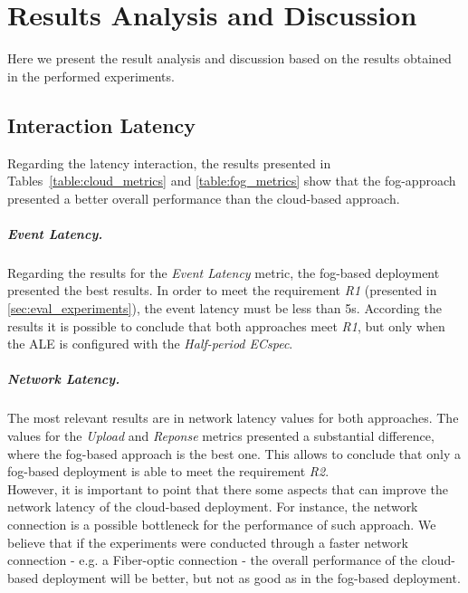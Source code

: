         \section{Results Analysis and Discussion}
        \label{sec:eval_analysis}
        Here we present the result analysis and discussion based on the results obtained in the performed
        experiments.

        \subsection{Interaction Latency}
        \label{subs:eval_results_latency}
        Regarding the latency interaction, the results presented in Tables~\ref{table:cloud_metrics} and
        \ref{table:fog_metrics} show that the fog-approach presented a better overall performance than
        the cloud-based approach.

        \subparagraph{Event Latency.}
        \label{subp:eval_event_latency}
        Regarding the results for the \textit{Event Latency} metric, the fog-based deployment presented the
        best results. In order to meet the requirement \textit{R1} (presented in \ref{sec:eval_experiments}),
        the event latency must be less than 5s. According the results it is possible to conclude that both
        approaches meet \textit{R1}, but only when the \gls{ALE} is configured with the \textit{Half-period ECspec}.

        \subparagraph{Network Latency.}
        \label{subp:eval_network_latency}
        The most relevant results are in network latency values for both approaches. The values for the \textit{Upload}
        and \textit{Reponse} metrics presented a substantial difference, where the fog-based approach is the
        best one. This allows to conclude that only a fog-based deployment is able to meet the requirement \textit{R2}.\\

        However, it is important to point that there some aspects that can improve the network latency
        of the cloud-based deployment. For instance, the network connection is a possible bottleneck for the
        performance of such approach. We believe that if the experiments were conducted through a faster
        network connection - e.g. a Fiber-optic connection - the overall performance of the cloud-based
        deployment will be better, but not as good as in the fog-based deployment.

